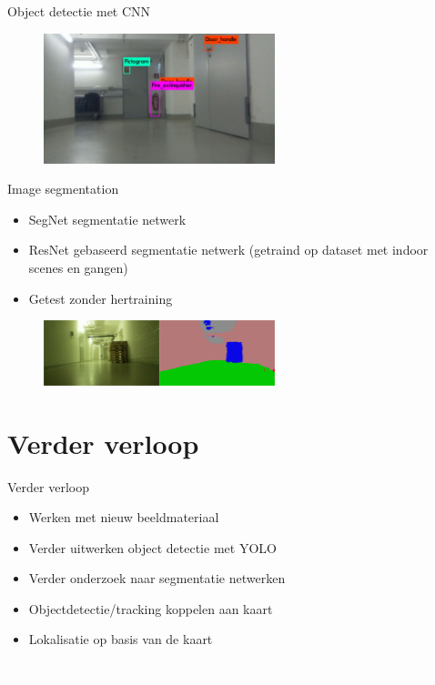 \documentclass[11pt,t]{beamer}
\begin{document}
\begin{frame}[fragile]{Object detectie met CNN}
	\begin{figure}
		\centering
		\includegraphics[width=0.6\textwidth]{graphics/yolo_detectie2.jpg}
		\flushleft
	\end{figure}
\end{frame}

\begin{frame}[fragile]{Image segmentation}
	\begin{itemize}
		\item SegNet segmentatie netwerk
		\item ResNet gebaseerd segmentatie netwerk (getraind op dataset met indoor scenes en gangen)
		\item Getest zonder hertraining
	\end{itemize}

	\begin{figure}
		\centering
		\includegraphics[width=0.6\textwidth]{graphics/resnet_segmentatie.png}
		\flushleft
	\end{figure}
\end{frame}

 \section{Verder verloop}
 \begin{frame}[fragile]{Verder verloop}
	\begin{itemize}
		\item Werken met nieuw beeldmateriaal
		\item Verder uitwerken object detectie met YOLO
		\item Verder onderzoek naar segmentatie netwerken
		\item Objectdetectie/tracking koppelen aan kaart
		\item Lokalisatie op basis van de kaart
	\end{itemize}
 \end{frame}

\begin{frame}

\centering
\textcolor{white}{Vragen?}
\end{frame}
\end{document}
